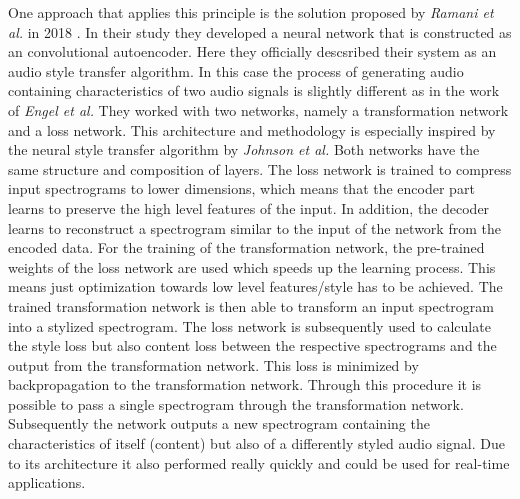 One approach that applies this principle is the solution proposed by \textit{Ramani et al.} in 2018 \cite{Ramani2018}. In their study they developed a neural network that is constructed as an convolutional autoencoder. Here they officially descsribed their system as an audio style transfer algorithm. In this case the process of generating audio containing characteristics of two audio signals is slightly different as in the work of \textit{Engel et al.} They worked with two networks, namely a transformation network and a loss network. This architecture and methodology is especially inspired by the neural style transfer algorithm by \textit{Johnson et al.} Both networks have the same structure and composition of layers. The loss network is trained to compress input spectrograms to lower dimensions, which means that the encoder part learns to preserve the high level features of the input. In addition, the decoder learns to reconstruct a spectrogram similar to the input of the network from the encoded data. For the training of the transformation network, the pre-trained weights of the loss network are used which speeds up the learning process. This means just optimization towards low level features/style has to be achieved. The trained transformation network is then able to transform an input spectrogram into a stylized spectrogram. The loss network is subsequently used to calculate the style loss but also content loss between the respective spectrograms and the output from the transformation network. This loss is minimized by backpropagation to the transformation network. Through this procedure it is possible to pass a single spectrogram through the transformation network. Subsequently the network outputs a new spectrogram containing the characteristics of itself (content) but also of a differently styled audio signal. Due to its architecture it also performed really quickly and could be used for real-time applications.

